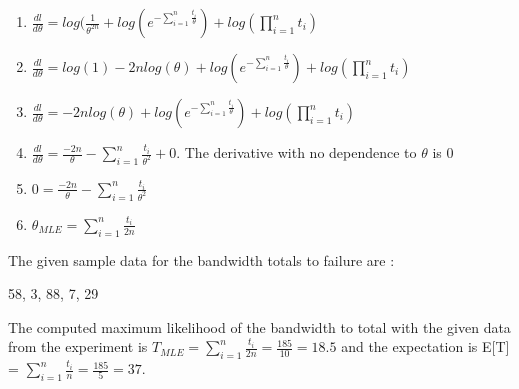 \begin{enumerate}
    \item $ \frac{dl}{d\theta} = log(\frac{1}{\theta^{2n}} + log(e^{-\sum_{i=1}^{n} \frac{t_i}{\theta}}) + log(\prod_{i=1}^{n} t_i)$
    \item $ \frac{dl}{d\theta} = log(1) - 2n log(\theta) + log(e^{-\sum_{i=1}^{n} \frac{t_i}{\theta}}) + log(\prod_{i=1}^{n} t_i)$
    \item $ \frac{dl}{d\theta} =- 2n log(\theta) + log(e^{-\sum_{i=1}^{n} \frac{t_i}{\theta}}) + log(\prod_{i=1}^{n} t_i)$
    \item $ \frac{dl}{d\theta} =\frac{-2n}{\theta} - {\sum_{i=1}^{n} \frac{t_i}{\theta^2}}+0$. The derivative with no dependence to $\theta$ is 0
    \item $ 0 =\frac{-2n}{\theta} - {\sum_{i=1}^{n} \frac{t_i}{\theta^2}}$
    \item $ \theta_{MLE} ={\sum_{i=1}^{n} \frac{t_i}{2n}}$
\end{enumerate}
The given sample data for the bandwidth totals to failure are :
\begin{center}
    58, 3, 88, 7, 29
\end{center} 
The computed maximum likelihood of the bandwidth to total with the given data from the experiment is $T_{MLE}={\sum_{i=1}^{n} \frac{t_i}{2n}} = \frac{185}{10} =18.5$ and the expectation is E[T] = $\sum_{i=1}^{n} \frac{t_i}{n} = \frac{185}{5} = 37$.